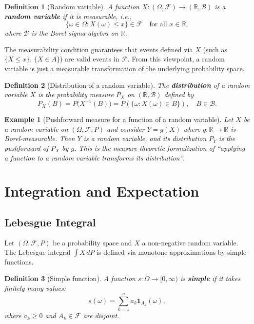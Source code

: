 \documentclass[11pt,a4paper]{article}
\newtheorem{definition}{Definition}[section]
\newtheorem{example}{Example}[section]
\numberwithin{equation}{section}
\begin{document}
\begin{definition}[Random variable]
A function $X : (\Omega,\mathcal{F}) \to (\mathbb{R},\mathcal{B})$ is a \textbf{random variable} if it is measurable, i.e.,
\[
\{ \omega \in \Omega : X(\omega) \le x \} \in \mathcal{F}
\quad\text{for all } x \in \mathbb{R},
\]
where $\mathcal{B}$ is the Borel sigma-algebra on $\mathbb{R}$.
\end{definition}

The measurability condition guarantees that events defined via $X$ (such as $\{X\le x\}$, $\{X\in A\}$) are valid events in $\mathcal{F}$. 
From this viewpoint, a random variable is just a measurable transformation of the underlying probability space.

\begin{definition}[Distribution of a random variable]
The \textbf{distribution} of a random variable $X$ is the probability measure $P_X$ on $(\mathbb{R},\mathcal{B})$ defined by
\[
P_X(B) = P\big(X^{-1}(B)\big)
= P(\{\omega : X(\omega) \in B\}),\quad B \in \mathcal{B}.
\]
\end{definition}

\begin{example}[Pushforward measure for a function of a random variable]
Let $X$ be a random variable on $(\Omega,\mathcal{F},P)$ and consider $Y = g(X)$ where $g:\mathbb{R}\to\mathbb{R}$ is Borel-measurable. 
Then $Y$ is a random variable, and its distribution $P_Y$ is the \emph{pushforward} of $P_X$ by $g$. 
This is the measure-theoretic formalization of ``applying a function to a random variable transforms its distribution''.

\end{example}

\newpage

\section{Integration and Expectation}

\subsection{Lebesgue Integral}

Let $(\Omega,\mathcal{F},P)$ be a probability space and $X$ a non-negative random variable. 
The Lebesgue integral $\int X\,dP$ is defined via monotone approximations by simple functions.

\begin{definition}[Simple function]
A function $s:\Omega \to [0,\infty)$ is \textbf{simple} if it takes finitely many values:
\[
s(\omega) = \sum_{k=1}^n a_k \mathbf{1}_{A_k}(\omega),
\]
where $a_k \ge 0$ and $A_k \in \mathcal{F}$ are disjoint.
\end{definition}
\end{document}
